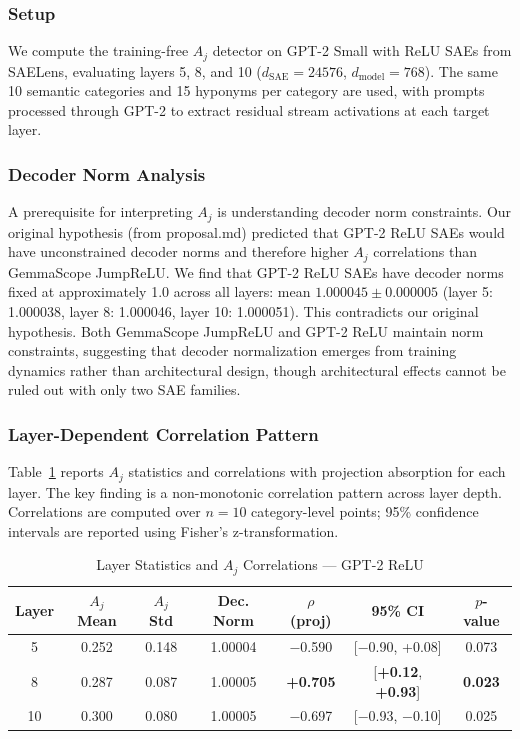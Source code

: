 \documentclass{article}
\begin{document}
\subsubsection{Setup}

We compute the training-free $A_j$ detector on GPT-2 Small with ReLU SAEs from SAELens, evaluating layers 5, 8, and 10 ($d_{\text{SAE}} = 24576$, $d_{\text{model}} = 768$). The same 10 semantic categories and 15 hyponyms per category are used, with prompts processed through GPT-2 to extract residual stream activations at each target layer.

\subsubsection{Decoder Norm Analysis}

A prerequisite for interpreting $A_j$ is understanding decoder norm constraints. Our original hypothesis (from proposal.md) predicted that GPT-2 ReLU SAEs would have unconstrained decoder norms and therefore higher $A_j$ correlations than GemmaScope JumpReLU. We find that GPT-2 ReLU SAEs have decoder norms fixed at approximately 1.0 across all layers: mean $1.000045 \pm 0.000005$ (layer 5: 1.000038, layer 8: 1.000046, layer 10: 1.000051). This contradicts our original hypothesis. Both GemmaScope JumpReLU and GPT-2 ReLU maintain norm constraints, suggesting that decoder normalization emerges from training dynamics rather than architectural design, though architectural effects cannot be ruled out with only two SAE families.

\subsubsection{Layer-Dependent Correlation Pattern}

Table~\ref{tab:e6v2} reports $A_j$ statistics and correlations with projection absorption for each layer. The key finding is a non-monotonic correlation pattern across layer depth. Correlations are computed over $n = 10$ category-level points; 95\% confidence intervals are reported using Fisher's z-transformation.

\begin{table}[t]
\caption{Layer Statistics and $A_j$ Correlations --- GPT-2 ReLU}
\label{tab:e6v2}
\centering
\small
\begin{tabular}{ccccccc}
\toprule
Layer & $A_j$ Mean & $A_j$ Std & Dec. Norm & $\rho$ (proj) & 95\% CI & $p$-value \\
\midrule
5 & 0.252 & 0.148 & 1.00004 & $-$0.590 & [$-$0.90, +0.08] & 0.073 \\
8 & 0.287 & 0.087 & 1.00005 & \textbf{+0.705} & [\textbf{+0.12}, \textbf{+0.93}] & \textbf{0.023} \\
10 & 0.300 & 0.080 & 1.00005 & $-$0.697 & [$-$0.93, $-$0.10] & 0.025 \\
\bottomrule
\end{tabular}
\end{table}
\end{document}
